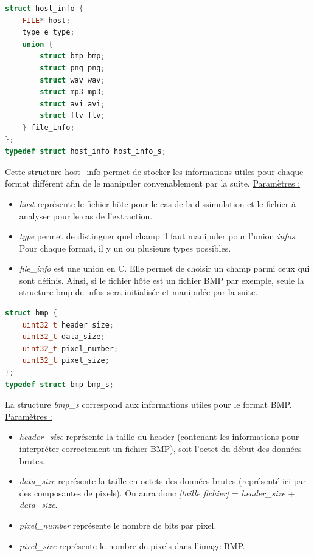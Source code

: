 \documentclass[11pt]{article}
\begin{document}
\begin{lstlisting}[language=c]
struct host_info {
    FILE* host;
    type_e type;
    union {
        struct bmp bmp;
        struct png png;
        struct wav wav;
        struct mp3 mp3;
        struct avi avi;
        struct flv flv;
    } file_info;
};
typedef struct host_info host_info_s;
\end{lstlisting}

Cette structure host\_info permet de stocker les informations 
utiles pour chaque format différent afin de le manipuler convenablement 
par la suite. 
\newline
\underline{Paramètres :}
\begin{itemize}
\item \textit{host} représente le fichier hôte pour le cas de la dissimulation 
et le fichier à analyser pour le cas de l'extraction. 
\item \textit{type} permet de distinguer quel champ il faut manipuler pour l'union 
\textit{infos}. Pour chaque format, il y un ou plusieurs types possibles.
\item \textit{file\_info} est une union en C. Elle permet de choisir un champ parmi
ceux qui sont définis. Ainsi, si le fichier hôte est un fichier BMP par exemple, 
seule la structure bmp de infos sera initialisée et manipulée par la suite.
\newline
\end{itemize}

\begin{lstlisting}[language=c]
struct bmp {
	uint32_t header_size;
	uint32_t data_size;
	uint32_t pixel_number;
	uint32_t pixel_size;
};
typedef struct bmp bmp_s;
\end{lstlisting}

La structure \textit{bmp\_s} correspond aux informations 
utiles pour le format BMP.  
\newline
\underline{Paramètres :}
\begin{itemize}
\item \textit{header\_size} représente la taille du header (contenant les 
informations pour interpréter correctement un fichier BMP), soit l'octet 
du début des données brutes. 
\item \textit{data\_size} représente la taille en octets des données brutes 
(représenté ici par des composantes de pixels). On aura donc 
\textit{[taille fichier]} = \textit{header\_size} + \textit{data\_size}.
\item \textit{pixel\_number} représente le nombre de bits par pixel. 
\item \textit{pixel\_size} représente le nombre de pixels dans l'image BMP. 
\newline
\end{itemize}
\end{document}
